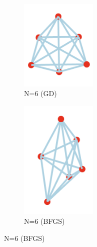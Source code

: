 \documentclass[11pt,onecolumn]{article}
\begin{document}
\begin{figure}[h]
  \begin{subfigure}[b]{0.4\textwidth}
    \centering
    \includegraphics[width=0.4\textwidth]{N6_1.png}
    \caption{N=6 (GD)}
    \label{fig:sub3}
  \end{subfigure}
  \hfill
  \begin{subfigure}[b]{0.4\textwidth}
    \centering
    \includegraphics[width=0.4\textwidth]{N6_2.png}
    \caption{N=6 (BFGS)}
    \label{fig:sub4}
  \end{subfigure}

  \vspace{0.5em}


\end{figure}
\end{document}
